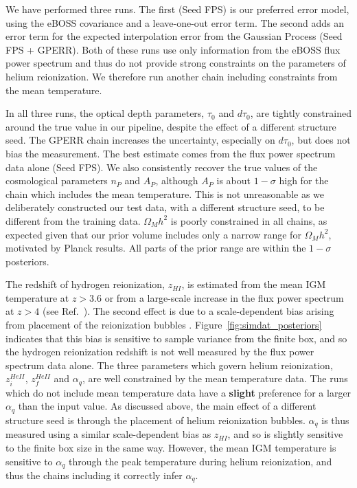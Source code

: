 We have performed three runs.
The first (Seed FPS) is our preferred error model, using the eBOSS covariance and a leave-one-out error term.
The second adds an error term for the expected interpolation error from the Gaussian Process (Seed FPS + GPERR).
Both of these runs use only information from the eBOSS flux power spectrum and thus do not provide strong constraints on the parameters of helium reionization.
We therefore run another chain including constraints from the mean temperature.

In all three runs, the optical depth parameters, $\tau_0$ and $d\tau_0$, are tightly constrained around the true value in our pipeline, despite the effect of a different structure seed. The GPERR chain increases the uncertainty, especially on $d\tau_0$, but does not bias the measurement.
The best estimate comes from the flux power spectrum data alone (Seed FPS).
We also consistently recover the true values of the cosmological parameters $n_P$ and $A_P$, although $A_P$ is about $1-\sigma$ high for the chain which includes the mean temperature.
This is not unreasonable as we deliberately constructed our test data, with a different structure seed, to be different from the training data.
$\Omega_M h^2$ is poorly constrained in all chains, as expected given that our prior volume includes only a narrow range for $\Omega_M h^2$, motivated by Planck results.
All parts of the prior range are within the $1-\sigma$ posteriors.

The redshift of hydrogen reionization, $z_{HI}$, is estimated from the mean IGM temperature at $z > 3.6$ or from a large-scale increase in the flux power spectrum at $z > 4$ (see Ref.~\cite{2023simsuite}).
The second effect is due to a scale-dependent bias arising from placement of the reionization bubbles \cite{Montero:2019}.
Figure~\ref{fig:simdat_posteriors} indicates that this bias is sensitive to sample variance from the finite box, and so the hydrogen reionization redshift is not well measured by the flux power spectrum data alone.
The three parameters which govern helium reionization, $z_i^{HeII}$, $z_f^{HeII}$ and $\alpha_q$, are well constrained by the mean temperature data.
The runs which do not include mean temperature data have a \textbf{slight} preference for a larger $\alpha_q$ than the input value.
As discussed above, the main effect of a different structure seed is through the placement of helium reionization bubbles.
$\alpha_q$ is thus measured using a similar scale-dependent bias as $z_{HI}$, and so is slightly sensitive to the finite box size in the same way.
However, the mean IGM temperature is sensitive to $\alpha_q$ through the peak temperature during helium reionization, and thus the chains including it correctly infer $\alpha_q$.

